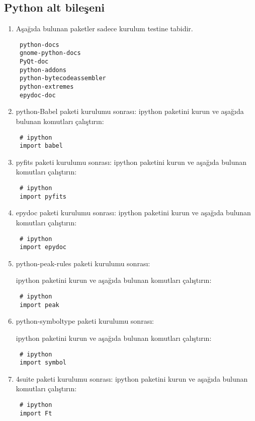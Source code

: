 \documentclass[a4paper,10pt]{article}
\begin{document}
\subsection{Python alt bileşeni}
\begin{enumerate}

\item Aşağıda bulunan paketler sadece kurulum testine tabidir.
\begin{verbatim}
 python-docs
 gnome-python-docs
 PyQt-doc
 python-addons
 python-bytecodeassembler
 python-extremes
 epydoc-doc
\end{verbatim}

\item python-Babel paketi kurulumu sonrası:
ipython paketini kurun ve aşağıda bulunan komutları çalıştırın:
\begin{verbatim}
 # ipython
 import babel
\end{verbatim}

\item pyfits paketi kurulumu sonrası:
ipython paketini kurun ve aşağıda bulunan komutları çalıştırın:
\begin{verbatim}
 # ipython
 import pyfits
\end{verbatim}


\item epydoc paketi kurulumu sonrası:
ipython paketini kurun ve aşağıda bulunan komutları çalıştırın:
\begin{verbatim}
 # ipython
 import epydoc
\end{verbatim}

\item python-peak-rules paketi kurulumu sonrası:

ipython paketini kurun ve aşağıda bulunan komutları çalıştırın:
\begin{verbatim}
 # ipython
 import peak
\end{verbatim}

\item python-symboltype paketi kurulumu sonrası:

ipython paketini kurun ve aşağıda bulunan komutları çalıştırın:
\begin{verbatim}
 # ipython
 import symbol
\end{verbatim}

\item 4suite paketi kurulumu sonrası:
ipython paketini kurun ve aşağıda bulunan komutları çalıştırın:
\begin{verbatim}
 # ipython
 import Ft
\end{verbatim}



\end{enumerate}
\end{document}
